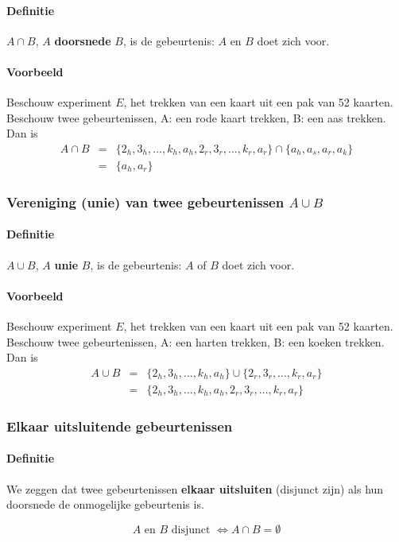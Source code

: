 \documentclass[12pt,twoside]{article}
\begin{document}
\paragraph*{Definitie}
$A\cap B$, $A$ {\bf doorsnede} $B$, is de gebeurtenis: $A$ en $B$ doet zich voor.

\paragraph*{Voorbeeld}
Beschouw experiment $E$, het trekken van een kaart uit een pak van 52 kaarten. Beschouw twee gebeurtenissen, A: een rode kaart trekken, B: een aas trekken. Dan is\\
\begin{eqnarray*}
A\cap B &=& \{2_h, 3_h, \ldots, k_h, a_h, 2_r, 3_r, \ldots, k_r, a_r\}\cap\{a_h, a_s, a_r, a_k\}\\
        &=& \{a_h, a_r\}
\end{eqnarray*}

\subsubsection{Vereniging (unie) van twee gebeurtenissen $A\cup B$}

\paragraph*{Definitie}
$A\cup B$, $A$ {\bf unie} $B$, is de gebeurtenis: $A$ of $B$ doet zich voor.

\paragraph*{Voorbeeld}
Beschouw experiment $E$, het trekken van een kaart uit een pak van 52 kaarten. Beschouw twee gebeurtenissen, A: een harten trekken, B: een koeken trekken. Dan is\\
\begin{eqnarray*}
A\cup B &=& \{2_h, 3_h, \ldots, k_h,a_h\}\cup\{2_r, 3_r, \ldots, k_r, a_r\}\\
        &=& \{2_h, 3_h, \ldots, k_h, a_h, 2_r, 3_r, \ldots, k_r, a_r\}
\end{eqnarray*}

\subsubsection{Elkaar uitsluitende gebeurtenissen}

\paragraph*{Definitie}
We zeggen dat twee gebeurtenissen {\bf elkaar uitsluiten} (disjunct zijn) als hun doorsnede
de onmogelijke gebeurtenis is.\\
\begin{mdframed}
$$A\mbox{ en }B\mbox{ disjunct }\Leftrightarrow A\cap B = \emptyset$$
\end{mdframed}
\end{document}
